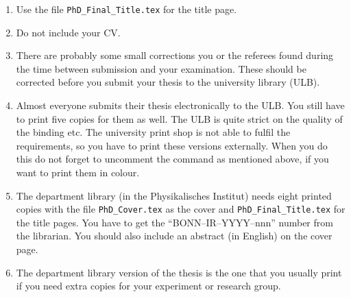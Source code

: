 \begin{enumerate}
\item Use the file \texttt{PhD\_Final\_Title.tex} for the title page.
\item Do not include your CV.
\item There are probably some small corrections you or the referees
  found during the time between submission and your examination. These
  should be corrected before you submit your thesis to the university
  library (ULB).
\item Almost everyone submits their thesis electronically to the
  ULB. You still have to print five copies for them as well. The ULB is
  quite strict on the quality of the binding etc. The university
  print shop is not able to fulfil the requirements, so you have to print
  these versions externally. When you do this do not forget to
  uncomment the  command as mentioned above, if you
  want to print them in colour.
\item The department
  library (in the Physikalisches
  Institut) needs eight printed copies with the file
  \texttt{PhD\_Cover.tex} as the cover and
  \texttt{PhD\_Final\_Title.tex} for the title pages. You have to get
  the \enquote{BONN--IR--YYYY--nnn} number from the librarian. You
  should also include an abstract (in English) on the cover page.
\item The department library version of the thesis is the one that you usually print if
  you need extra copies for your experiment or research group.
\end{enumerate}


